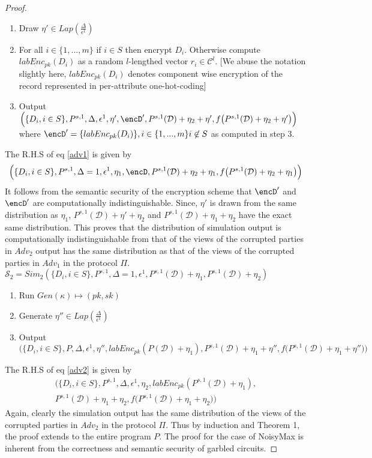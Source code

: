 \begin{proof}
\begin{enumerate}
\item Draw $\eta' \in Lap(\frac{\Delta}{\epsilon^1})$
\item For all $i \in \{1,...,m\}$ if $i \in S$ then encrypt $D_i$. 
Otherwise compute $labEnc_{pk}(D_i)$ as a random $l$-lengthed vector $r_i \in \mathcal{C}^l$. [We abuse the notation slightly here, $labEnc_{pk}(D_i)$ denotes component wise encryption of the record represented in per-attribute one-hot-coding]
\item Output $\Big(\{D_i, i \in S\},P^{s,1},\Delta,\epsilon^1,\eta',\encD',P^{s,1}(\mathcal{D})+\eta_2+\eta',f\big(P^{s,1}(\mathcal{D})+\eta_2+\eta'\big)\Big)$ where $\encD'=\{labEnc_{pk}(D_i)\},i \in \{1,...,m\} i \not \in S$ as computed in step 3.
\end{enumerate}
The R.H.S of eq \ref{adv1}  is given by 
\begin{gather}\Big(\{D_i, i \in S\},P^{s,1},\Delta=1,\epsilon^1, \eta_1,\encD,P^{s,1}(\mathcal{D})+\eta_2+\eta_1,f\big(P^{s,1}(\mathcal{D})+\eta_2+\eta_1\big)\Big)\end{gather}
It follows from the semantic security of the encryption scheme that $\encD'$ and $\encD'$ are computationally indistinguishable.
Since, $\eta'$ is drawn from the same distribution as $\eta_1$, $P^{s,1}(\mathcal{D})+\eta'+\eta_2$ and $P^{s,1}(\mathcal{D})+\eta_1+\eta_2$ have the exact same distribution. This proves that the distribution of simulation output is computationally indistinguishable from that of the views of the corrupted parties in $Adv_2$
output has the same distribution as that of the views of the corrupted parties in $Adv_1$ in the
protocol $\Pi$.\\
$\mathcal{S}_2=Sim_2(\{D_i, i \in S\},P^{s,1},\Delta=1,\epsilon^1,P^{s,1}(\mathcal{D})+\eta_1,P^{s,1}(\mathcal{D})+\eta_2)$
\begin{enumerate}\item Run $Gen(\kappa)\mapsto (pk,sk)$ \item Generate $\eta'' \in Lap(\frac{\Delta}{\epsilon^1})$ \item Output $\Big(\{D_i, i \in S\},P,\Delta,\epsilon^1, \eta'', labEnc_{pk}(P(\mathcal{D})+\eta_1), P^{s,1}(\mathcal{D})+\eta_1+\eta'',f\big(P^{s,1}(\mathcal{D})+\eta_1+\eta''\big)\Big)$
\end{enumerate}
The R.H.S of eq \ref{adv2} is given by \begin{gather}\Big(\{D_i, i \in S\},P^{s,1},\Delta,\epsilon^1,\eta_2,labEnc_{pk}(P^{s,1}(\mathcal{D})+\eta_1),\\P^{s,1}(\mathcal{D})+\eta_1+\eta_2,f\big(P^{s,1}(\mathcal{D})+\eta_1+\eta_2\big)\Big)\end{gather}
Again, clearly the simulation output has the same distribution of the
views of the corrupted parties in $Adv_2$ in the protocol $\Pi$. 
Thus by induction and Theorem 1,  the proof extends to the entire program $P$.
The proof for the case of NoisyMax is inherent from the correctness and semantic security of garbled circuits.
\end{proof}